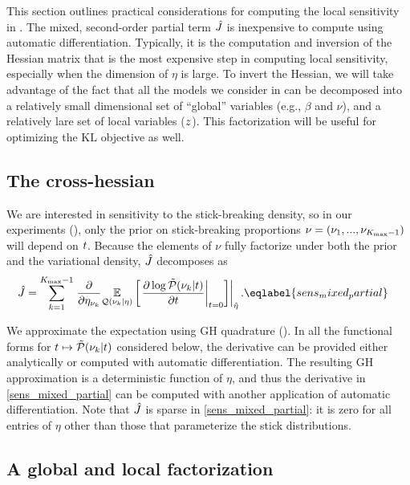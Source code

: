
This section outlines practical considerations for computing the local
sensitivity in . The mixed, second-order partial term
$\hat J$ is inexpensive to compute using automatic differentiation.
Typically, it is the computation and inversion of the Hessian matrix that is the
most expensive step in computing local sensitivity, especially when the
dimension of $\eta$ is large. To invert the Hessian, we will take advantage of
the fact that all the models we consider in  can be decomposed
into a relatively small dimensional set of ``global'' variables (e.g., $\beta$
and $\nu$), and a relatively lare set of local variables ($z$). This
factorization will be useful for optimizing the $\mathrm{KL}$ objective as well.

\subsection{The cross-hessian}

We are interested in sensitivity to the stick-breaking density, so in our
experiments (), only the prior on stick-breaking proportions
$\nu = (\nu_1, ..., \nu_{{K_{\mathrm{max}}} - 1})$ will depend on $t$. Because the elements
of $\nu$ fully factorize under both the prior and the variational density,
$\hat J$ decomposes as
%
\begin{align}
  \crosshessian
  &= \sum_{\k=1}^{\kmax - 1}
         \evalat{\frac{\partial}{\partial \etanuk} \expect{\q(\nuk \vert \eta)}
                {
                \fracat{\partial \log \ptil(\nuk \vert \t)}{\partial \t}{\t = 0}
                }}{\etaopt}.
\eqlabel{sens_mixed_partial}
\end{align}

We approximate the expectation using GH quadrature (). In
all the functional forms for $t \mapsto \tilde{\mathcal{P}}(\nu_{k} \vert t)$ considered below,
the derivative can be provided either analytically or computed with automatic
differentiation.  The resulting GH approximation is a deterministic function of
$\eta$, and thus the derivative in \eqref{sens_mixed_partial} can be computed
with another application of automatic differentiation. Note that $\hat J$
is sparse in \eqref{sens_mixed_partial}: it is zero for all entries of $\eta$
other than those that parameterize the stick distributions.

\subsection{A global and local factorization}

